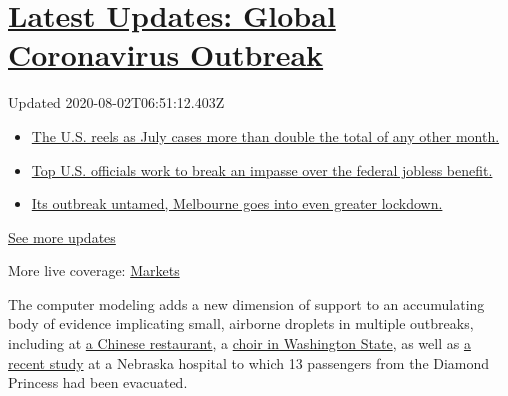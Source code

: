 \hypertarget{latest-updates-global-coronavirus-outbreak}{%
\section{\texorpdfstring{\href{https://www.nytimes.com/2020/08/01/world/coronavirus-covid-19.html?action=click\&pgtype=Article\&state=default\&region=MAIN_CONTENT_1\&context=storylines_live_updates}{Latest
Updates: Global Coronavirus
Outbreak}}{Latest Updates: Global Coronavirus Outbreak}}\label{latest-updates-global-coronavirus-outbreak}}

Updated 2020-08-02T06:51:12.403Z

\begin{itemize}
\tightlist
\item
  \href{https://www.nytimes.com/2020/08/01/world/coronavirus-covid-19.html?action=click\&pgtype=Article\&state=default\&region=MAIN_CONTENT_1\&context=storylines_live_updates\#link-34047410}{The
  U.S. reels as July cases more than double the total of any other
  month.}
\item
  \href{https://www.nytimes.com/2020/08/01/world/coronavirus-covid-19.html?action=click\&pgtype=Article\&state=default\&region=MAIN_CONTENT_1\&context=storylines_live_updates\#link-780ec966}{Top
  U.S. officials work to break an impasse over the federal jobless
  benefit.}
\item
  \href{https://www.nytimes.com/2020/08/01/world/coronavirus-covid-19.html?action=click\&pgtype=Article\&state=default\&region=MAIN_CONTENT_1\&context=storylines_live_updates\#link-2bc8948}{Its
  outbreak untamed, Melbourne goes into even greater lockdown.}
\end{itemize}

\href{https://www.nytimes.com/2020/08/01/world/coronavirus-covid-19.html?action=click\&pgtype=Article\&state=default\&region=MAIN_CONTENT_1\&context=storylines_live_updates}{See
more updates}

More live coverage:
\href{https://www.nytimes.com/live/2020/07/31/business/stock-market-today-coronavirus?action=click\&pgtype=Article\&state=default\&region=MAIN_CONTENT_1\&context=storylines_live_updates}{Markets}

The computer modeling adds a new dimension of support to an accumulating
body of evidence implicating small, airborne droplets in multiple
outbreaks, including at
\href{https://www.nytimes.com/2020/04/20/health/airflow-coronavirus-restaurants.html}{a
Chinese restaurant}, a
\href{https://www.medrxiv.org/content/10.1101/2020.06.15.20132027v2}{choir
in Washington State}, as well as
\href{https://www.nature.com/articles/s41598-020-69286-3}{a recent
study} at a Nebraska hospital to which 13 passengers from the Diamond
Princess had been evacuated.

